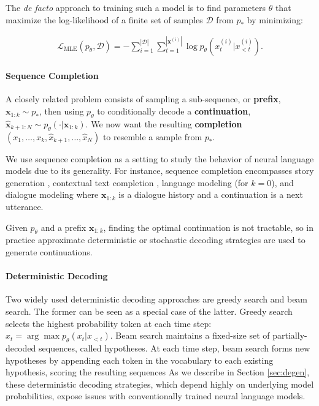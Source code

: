 The {\it de facto} approach to training such a model is to find parameters $\theta$ that maximize the log-likelihood of a finite set of samples $\mathcal{D}$ from $p_*$ by minimizing:

\begin{small}
\begin{align}
\label{eq:mle}
    \mathcal{L}_{\text{MLE}}(p_{\theta}, \mathcal{D})=-\sum_{i=1}^{|\mathcal{D}|}\sum_{t=1}^{|\textbf{x}^{(i)}|} \log p_{\theta}(x_{t}^{(i)}|x_{<t}^{(i)}).
\end{align}
\end{small}

\paragraph{Sequence Completion} 

A closely related problem consists of sampling a sub-sequence, or \textbf{prefix}, $\textbf{x}_{1:k}\sim p_*$, then using $p_\theta$ to conditionally decode a \textbf{continuation}, $\hat{\textbf{x}}_{k+1:N} \sim p_{\theta}(\cdot | \textbf{x}_{1:k})$. We now want the resulting \textbf{completion} $(x_1,\ldots,x_k,\hat{x}_{k+1},\ldots,\hat{x}_{N})$ to resemble a sample from $p_*$. 

We use sequence completion as a setting to study the behavior of neural language models due to its generality. For instance, sequence completion encompasses story generation \citep{fan2018hierarchical}, contextual text completion \citep{radford2019language}, language modeling (for $k=0$), and dialogue modeling \citep{Zhang2018PersonalizingToo} where $\textbf{x}_{1:k}$ is a dialogue history and a continuation is a next utterance.

Given $p_\theta$ and a prefix $\textbf{x}_{1:k}$, finding the optimal continuation is not tractable, so in practice approximate deterministic or stochastic decoding strategies are used to generate continuations. 

\paragraph{Deterministic Decoding}

Two widely used deterministic decoding approaches are greedy search and beam search. The former can be seen as a special case of the latter. { Greedy search} selects the highest probability token at each time step: $x_t=\arg\max p_{\theta}(x_t|x_{<t})$. 
{Beam search} maintains a fixed-size set of partially-decoded sequences, called hypotheses. At each time step, beam search forms new hypotheses by appending each token in the vocabulary to each existing hypothesis, scoring the resulting sequences As we describe in Section \ref{sec:degen}, these deterministic decoding strategies, which depend highly on underlying model probabilities, expose issues with conventionally trained neural language models.

